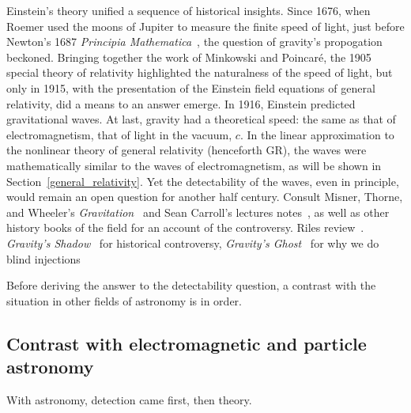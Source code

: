         Einstein's theory unified a sequence of historical insights. Since 1676, when Roemer used the moons of Jupiter to measure the finite speed of light, just before Newton's 1687 \textit{Principia Mathematica}~\cite{Hawking2002}, the question of gravity's propogation beckoned. 
Bringing together the work of Minkowski and Poincar\'{e}, the 1905 special theory of relativity highlighted the naturalness of the speed of light, but only in 1915, with the presentation of the Einstein field equations of general relativity, did a means to an answer emerge. 
In 1916, Einstein predicted gravitational waves. 
At last, gravity had a theoretical speed: the same as that of electromagnetism, that of light in the vacuum, $c$.
In the linear approximation to the nonlinear theory of general relativity (henceforth GR), the waves were mathematically similar to the waves of electromagnetism, as will be shown in Section~\ref{general_relativity}.
Yet the detectability of the waves, even in principle, would remain an open question for another half century. 
Consult Misner, Thorne, and Wheeler's \textit{Gravitation}~\cite{MisnerThorneWheeler} and Sean Carroll's lectures notes~\cite{Carroll1997}, as well as other history books of the field for an account of the controversy.
Riles review~\cite{Riles2013}.
\textit{Gravity's Shadow}~\cite{CollinsGravityShadow} for historical controversy,
\textit{Gravity's Ghost}~\cite{CollinsGravityGhost} for why we do blind injections

Before deriving the answer to the detectability question, a contrast with the situation in other fields of astronomy is in order.

 
        \subsection{Contrast with electromagnetic and particle astronomy}
        \label{contrast_astro}

        With astronomy, detection came first, then theory.


